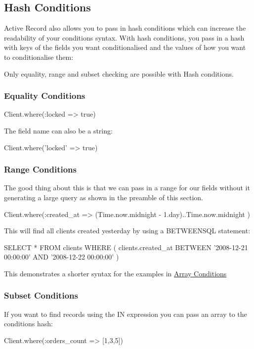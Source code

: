 \documentclass[10pt]{book}
\newenvironment{code}{%
  \scriptsize
    \verbatim
}{%
    \endverbatim
    \newline
}
\begin{document}
\subsection{ Hash Conditions}

Active Record also allows you to pass in hash conditions which can  increase the readability of your conditions syntax. With hash  conditions, you pass in a hash with keys of the fields you want  conditionalised and the values of how you want to conditionalise them:

Only equality, range and subset checking are possible with Hash conditions.

\subsubsection{ Equality Conditions}
\begin{code}
Client.where(:locked => true)
\end{code}

The field name can also be a string:
\begin{code}
Client.where('locked' => true)
\end{code}

\subsubsection{ Range Conditions}

The good thing about this is that we can pass in a range for our  fields without it generating a large query as shown in the preamble of  this section.
\begin{code}
Client.where(:created_at => 
(Time.now.midnight - 1.day)..Time.now.midnight
)
\end{code}

This will find all clients created yesterday by using a BETWEENSQL statement:
\begin{code}
SELECT * FROM clients WHERE (
clients.created_at BETWEEN '2008-12-21 00:00:00' AND '2008-12-22 00:00:00'
)
\end{code}

This demonstrates a shorter syntax for the examples in \hyperlink{array-conditions}{Array Conditions}

\subsubsection{ Subset Conditions}

If you want to find records using the IN expression you can pass an array to the conditions hash:
\begin{code}
Client.where(:orders_count => [1,3,5])
\end{code}
\end{document}
